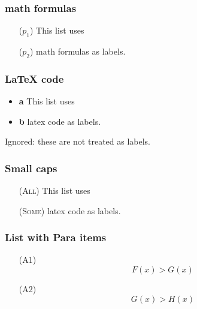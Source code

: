 \hypertarget{math-formulas}{%
\subsubsection{math formulas}\label{math-formulas}}

\begin{itemize}
\tightlist

\item[(\(p_1\))] This list uses

\item[(\(p_2\))] math formulas as labels.

\end{itemize}

\hypertarget{latex-code}{%
\subsubsection{LaTeX code}\label{latex-code}}

\begin{itemize}
\tightlist
\item
  {\textbf{a}} This list uses
\item
  {\textbf{b}} latex code as labels.
\end{itemize}

Ignored: these are not treated as labels.

\hypertarget{small-caps}{%
\subsubsection{Small caps}\label{small-caps}}

\begin{itemize}
\tightlist

\item[(\textsc{All})] This list uses

\item[(\textsc{Some})] latex code as labels.

\end{itemize}

\hypertarget{list-with-para-items}{%
\subsubsection{List with Para items}\label{list-with-para-items}}

\begin{itemize}
\tightlist

\item[(A1)] \[F(x) > G(x)\]

\item[(A2)] \[G(x) > H(x)\]

\end{itemize}

